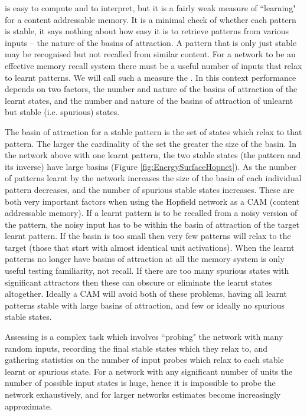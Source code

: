  is easy to compute and to interpret, but it is a fairly weak measure of ``learning" for a content addressable memory. It is a minimal check of whether each pattern is stable, it says nothing about how easy it is to retrieve patterns from various inputs -- the nature of the basins of attraction. A pattern that is only just stable may be recognised but not recalled from similar content. For a network to be an effective memory recall system there must be a useful number of inputs that relax to learnt patterns. We will call such a measure the .  In this context performance depends on two factors, the number and nature of the basins of attraction of the learnt states, and the number and nature of the basins of attraction of unlearnt but stable (i.e. spurious) states.  

The basin of attraction for a stable pattern is the set of states which relax to that pattern.  The larger the cardinality of the set the greater the size of the basin.  In the  network above with one learnt pattern, the two stable states (the pattern and its inverse) have large basins (Figure \ref{fig:EnergySurfaceHopnet}).  As the number of patterns learnt by the network increases the size of the basin of each individual pattern decreases, and the number of spurious stable states increases.  These are both very important factors when using the Hopfield network as a CAM (content addressable memory).  If a learnt pattern is to be recalled from a noisy version of the pattern, the noisy input has to be within the basin of attraction of the target learnt pattern.  If the basin is too small then very few patterns will relax to the target (those that start with almost identical unit activations).  When the learnt patterns no longer have basins of attraction at all the memory system is only useful testing familiarity, not recall.  If there are too many spurious states with significant attractors then these can obscure or eliminate the learnt states altogether.  Ideally a CAM will avoid both of these problems, having all learnt patterns stable with large basins of attraction, and few or ideally no spurious stable states. 
 
Assessing  is a complex task which involves ``probing" the network with many random inputs, recording the final stable states which they relax to, and gathering statistics on the number of input probes which relax to each stable learnt or spurious state.  For a network with any significant number of units the number of possible input states is huge, hence it is impossible to probe the network exhaustively, and for larger networks  estimates become increasingly approximate.
 
